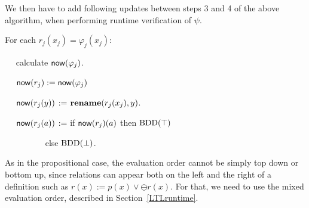 We then have to add
following updates between steps 3 and 4 of the above algorithm, when performing runtime verification of
$\psi$. 

\noindent \begin{description}
\item For each $r_j ( x_j ) = \varphi_j ( x_j )$:
\item{\ \ }  calculate $\mathsf{now} ( \varphi_j )$.
\item{\ \ }  $\mathsf{now} ( r_j )  := \mathsf{now} (\varphi_j)$
\item{\ \ } $\mathsf{now} ( r_j ( y ) )$ := $\mathbf{rename} ( r_j(x_j) ,  y )$.
\item{\ \ } $\mathsf{now} ( r_j ( a ) )$ := if $\mathsf{now} ( r_j ) ( a )$
then $\mathrm{BDD}(\top)$ 
\item{\ \ \ \ \ \ \ \ \ } else $\mathrm{BDD}(\bot)$.
\end{description}

As in the propositional case, the evaluation order cannot be
simply top down or bottom up, since relations can appear
both on the left and the right of a definition
such as $r ( x ) := p ( x ) \vee \ominus r ( x )$. For that,
we need to use the mixed evaluation order, described in Section~\ref{LTLruntime}.













